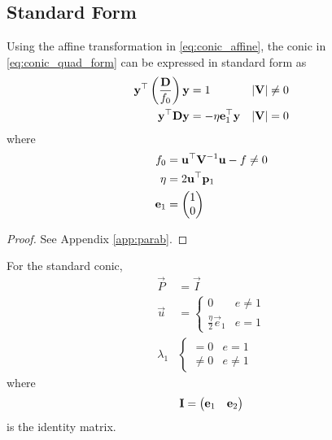 \documentclass[journal,12pt,onecolumn]{IEEEtran}
\begin{document}
\subsection{Standard Form}
\begin{theorem}
Using the affine transformation in
\eqref{eq:conic_affine},
	the conic in     \eqref{eq:conic_quad_form} can be expressed in standard form 
	as
  \begin{align}
    \label{eq:conic_simp_temp_nonparab}
	    \mathbf{y}^{\top}\left(\frac{\mathbf{D}}{f_0}\right)\mathbf{y} &= 1   &  \left\vert\mathbf{V}\right\vert &\ne 0
    \\
	    \mathbf{y}^{\top}\mathbf{D}\mathbf{y} &=  -\eta\mathbf{e}_1^{\top}\mathbf{y}   & \left\vert\mathbf{V}\right\vert &= 0
    \label{eq:conic_simp_temp_parab}
    \end{align}
    where
  \begin{align}
      \label{eq:f0}
	  f_0 &=\mathbf{u}^{\top}\mathbf{V}^{-1}\mathbf{u} -f \ne 0
	  \\
      \label{eq:eta}
       \eta &=2\mathbf{u}^{\top}\mathbf{p}_1
       \\
       \mathbf{e}_1 &=\begin{pmatrix}1 \\ 0\end{pmatrix}
      \end{align}
     
    \end{theorem}
\begin{proof}
  See Appendix \ref{app:parab}.
  \end{proof}
	  \begin{corollary}
		For the standard conic, 
				\begin{align}
					\label{eq:std-prm-P}
					\vec{P} &= \vec{I}
					\\
					\vec{u} &= 
				\begin{cases}
				0 & e \ne 1
       \\
				\frac{\eta}{2} \vec{e}_1 & e = 1
				\end{cases}
				\label{eq:std-prm-u}
				\\
				\lambda_1 &  
					\begin{cases}
						=0 & e = 1
						\\
						\ne 0 & e \ne 1
					\end{cases}
				\label{eq:std-prm-lam1}
				\end{align}
				where 
				\begin{align}
					\mathbf{I} = \begin{pmatrix}\mathbf{e}_1 & \mathbf{e}_2\end{pmatrix}
				\end{align}
				is the identity matrix.
	  \end{corollary}
\end{document}
